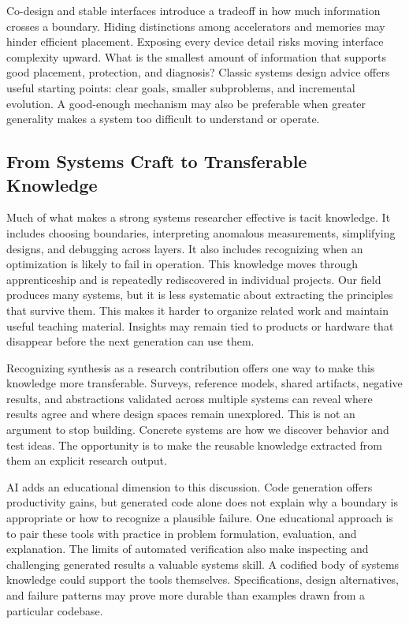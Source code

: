 \documentclass[manuscript]{acmart}
\begin{document}
Co-design and stable interfaces introduce a tradeoff in how much information crosses a boundary.
Hiding distinctions among accelerators and memories may hinder efficient placement.
Exposing every device detail risks moving interface complexity upward.
What is the smallest amount of information that supports good placement, protection, and diagnosis?
Classic systems design advice offers useful starting points: clear goals, smaller subproblems, and incremental evolution.
A good-enough mechanism may also be preferable when greater generality makes a system too difficult to understand or operate.

\subsection{From Systems Craft to Transferable Knowledge}

Much of what makes a strong systems researcher effective is tacit knowledge.
It includes choosing boundaries, interpreting anomalous measurements, simplifying designs, and debugging across layers.
It also includes recognizing when an optimization is likely to fail in operation.
This knowledge moves through apprenticeship and is repeatedly rediscovered in individual projects.
Our field produces many systems, but it is less systematic about extracting the principles that survive them.
This makes it harder to organize related work and maintain useful teaching material.
Insights may remain tied to products or hardware that disappear before the next generation can use them.

Recognizing synthesis as a research contribution offers one way to make this knowledge more transferable.
Surveys, reference models, shared artifacts, negative results,
and abstractions validated across multiple systems can reveal where results agree and where design spaces remain unexplored.
This is not an argument to stop building.
Concrete systems are how we discover behavior and test ideas.
The opportunity is to make the reusable knowledge extracted from them an explicit research output.

AI adds an educational dimension to this discussion.
Code generation offers productivity gains, but generated code alone does not explain why a boundary is appropriate or how to recognize a plausible failure.
One educational approach is to pair these tools with practice in problem formulation, evaluation, and explanation.
The limits of automated verification also make inspecting and challenging generated results a valuable systems skill.
A codified body of systems knowledge could support the tools themselves.
Specifications, design alternatives, and failure patterns may prove more durable than examples drawn from a particular codebase.
\end{document}
